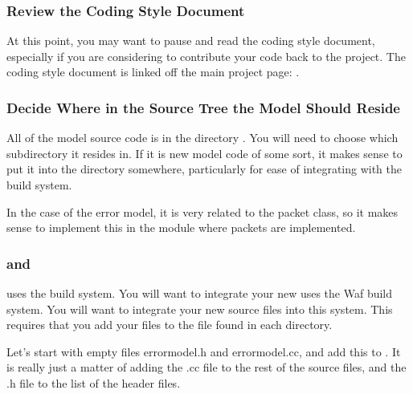 \documentclass[letterpaper,10pt,english]{sphinxmanual}
\renewcommand{\sphinxcode}[1]{\texttt{\small{#1}}}
\begin{document}
\subsubsection{Review the  Coding Style Document}
\label{\detokenize{new-models:review-the-ns3-coding-style-document}}
At this point, you may want to pause and read the  coding style document,
especially if you are considering to contribute your code back to the project.
The coding style document is linked off the main project page: .


\subsubsection{Decide Where in the Source Tree the Model Should Reside}
\label{\detokenize{new-models:decide-where-in-the-source-tree-the-model-should-reside}}
All of the  model source code is in the directory \sphinxcode{}.  You will need
to choose which subdirectory it resides in. If it is new model code of some
sort, it makes sense to put it into the \sphinxcode{} directory somewhere,
particularly for ease of integrating with the build system.

In the case of the error model, it is very related to the packet class, so it
makes sense to implement this in the \sphinxcode{} module where 
packets are implemented.


\subsubsection{ and }
\label{\detokenize{new-models:waf-and-wscript}}
 uses the  build system.
You will want to integrate your new  uses the Waf build system. You will
want to integrate your new source files into this system. This requires that you
add your files to the \sphinxcode{} file found in each directory.

Let’s start with empty files error\sphinxhyphen{}model.h and error\sphinxhyphen{}model.cc, and add this to
\sphinxcode{}. It is really just a matter of adding the .cc file to the
rest of the source files, and the .h file to the list of the header files.
\end{document}
